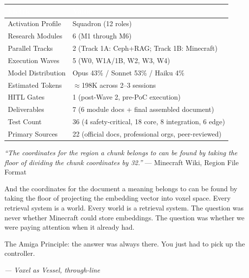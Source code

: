 \documentclass[11pt,letterpaper]{article}
\newcommand{\tableheader}[1]{\textbf{\sffamily\textcolor{white}{#1}}}
\begin{document}
\begin{center}
\begin{tabularx}{\textwidth}{L{5cm}X}
\toprule
{}
\tableheader{Metric} & \tableheader{Value} \\
\midrule
Activation Profile & Squadron (12 roles) \\
Research Modules & 6 (M1 through M6) \\
Parallel Tracks & 2 (Track 1A: Ceph+RAG; Track 1B: Minecraft) \\
Execution Waves & 5 (W0, W1A/1B, W2, W3, W4) \\
Model Distribution & Opus 43\% / Sonnet 53\% / Haiku 4\% \\
Estimated Tokens & $\approx$198K across 2--3 sessions \\
HITL Gates & 1 (post-Wave 2, pre-PoC execution) \\
Deliverables & 7 (6 module docs + final assembled document) \\
Test Count & 36 (4 safety-critical, 18 core, 8 integration, 6 edge) \\
Primary Sources & 22 (official docs, professional orgs, peer-reviewed) \\
\bottomrule
\end{tabularx}
\end{center}

\vspace{2em}

\begin{quotebox}
\textit{``The coordinates for the region a chunk belongs to can be found by taking the floor of dividing the chunk coordinates by 32.''} \hfill --- Minecraft Wiki, Region File Format

\vspace{0.8em}

And the coordinates for the document a meaning belongs to can be found by taking the floor of projecting the embedding vector into voxel space. Every retrieval system is a world. Every world is a retrieval system. The question was never whether Minecraft could store embeddings. The question was whether we were paying attention when it already had.

The Amiga Principle: the answer was always there. You just had to pick up the controller.

\vspace{0.5em}
\hfill \textit{--- Voxel as Vessel, through-line}
\end{quotebox}
\end{document}

